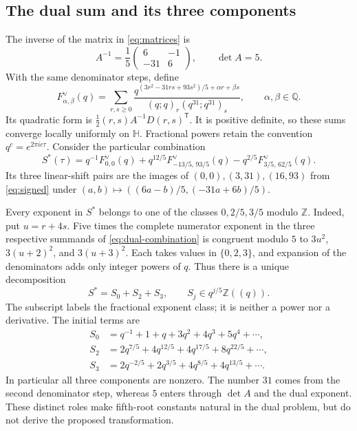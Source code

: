 \documentclass[11pt,reqno]{amsart}
\newcommand{\QQ}{\mathbb Q}
\newcommand{\ZZ}{\mathbb Z}
\newcommand{\HH}{\mathbb H}
\theoremstyle{remark}
\numberwithin{equation}{section}
\begin{document}
\subsection{The dual sum and its three components}
The inverse of the matrix in \eqref{eq:matrices} is
\[
 A^{-1}=\frac15\begin{pmatrix}6&-1\\-31&6\end{pmatrix},
 \qquad \det A=5.
\]
With the same denominator steps, define
\begin{equation}\label{eq:dual-family}
 F^{\vee}_{\alpha,\beta}(q)=
 \sum_{r,s\geq0}
 \frac{q^{(3r^2-31rs+93s^2)/5+\alpha r+\beta s}}
 {(q;q)_r(q^{31};q^{31})_s},\qquad \alpha,\beta\in\QQ.
\end{equation}
Its quadratic form is $\tfrac12(r,s)A^{-1}D(r,s)^{\mathsf T}$.
It is positive definite, so these sums converge locally uniformly on
$\HH$. Fractional powers retain the convention
$q^c=e^{2\pi i c\tau}$. Consider the particular combination
\begin{equation}\label{eq:dual-combination}
 S^*(\tau)=q^{-1}F^{\vee}_{0,0}(q)
 +q^{12/5}F^{\vee}_{-13/5,\,93/5}(q)
 -q^{2/5}F^{\vee}_{3/5,\,62/5}(q).
\end{equation}
Its three linear-shift pairs are the images of
$(0,0),(3,31),(16,93)$ from \eqref{eq:signed} under
$(a,b)\mapsto((6a-b)/5,(-31a+6b)/5)$.

Every exponent in $S^*$ belongs to one of the classes
$0,2/5,3/5$ modulo $\ZZ$. Indeed, put $u=r+4s$. Five times
the complete numerator exponent in the three respective summands of
\eqref{eq:dual-combination} is congruent modulo $5$ to
$3u^2$, $3(u+2)^2$, and $3(u+3)^2$. Each takes values in
$\{0,2,3\}$, and expansion of the denominators adds only integer
powers of $q$. Thus there is a unique decomposition
\begin{equation}\label{eq:dual-splitting}
 S^*=S_0+S_2+S_3,\qquad S_j\in q^{j/5}\ZZ((q)).
\end{equation}
The subscript labels the fractional exponent class; it is neither a
power nor a derivative. The initial terms are
\begin{equation}\label{eq:dual-initial}
\begin{aligned}
 S_0&=q^{-1}+1+q+3q^2+4q^3+5q^4+\cdots,\\
 S_2&=2q^{7/5}+4q^{12/5}+4q^{17/5}+8q^{22/5}+\cdots,\\
 S_3&=2q^{-2/5}+2q^{3/5}+4q^{8/5}+4q^{13/5}+\cdots.
\end{aligned}
\end{equation}
In particular all three components are nonzero.
The number $31$ comes from the second denominator step, whereas $5$
enters through $\det A$ and the dual exponent. These distinct roles
make fifth-root constants natural in the dual problem, but do not
derive the proposed transformation.
\end{document}
